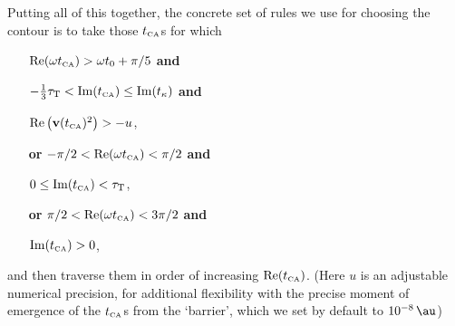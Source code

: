 Putting all of this together, the concrete set of rules we use for choosing the contour is to take those ${t_{\scriptscriptstyle\mathrm{CA}}}$s for which
\begin{enumerate}[itemsep=-0.8mm]
\item[] $\Re(\omega {t_{\scriptscriptstyle\mathrm{CA}}})>\omega{t_0} +\pi/5$ \textbf{and}
\item[] $-\frac13 {\tau_\mathrm{T}}<\Im({t_{\scriptscriptstyle\mathrm{CA}}})\leq \Im({t_\kappa})$ \textbf{and}
\item[] $\Re\left(\vb{v}({t_{\scriptscriptstyle\mathrm{CA}}})^2\right) > -u$,
\item[\textbf{or}\hspace{3pt}] $-\pi/2 < \Re(\omega{t_{\scriptscriptstyle\mathrm{CA}}}) < \pi/2$ \textbf{and}
\item[] $0\leq\Im({t_{\scriptscriptstyle\mathrm{CA}}})<{\tau_\mathrm{T}}$,
\item[\textbf{or}\hspace{3pt}] $\pi/2 < \Re(\omega{t_{\scriptscriptstyle\mathrm{CA}}}) < 3\pi/2$ \textbf{and}
\item[] $\Im({t_{\scriptscriptstyle\mathrm{CA}}})>0$,
\end{enumerate}
and then traverse them in order of increasing $\Re({t_{\scriptscriptstyle\mathrm{CA}}})$. (Here $u$ is an adjustable numerical precision, for additional flexibility with the precise moment of emergence of the ${t_{\scriptscriptstyle\mathrm{CA}}}$s from the `barrier', which we set by default to $\SI{e-8}{\au}$)



\captionsetup[figure]{position=top}

